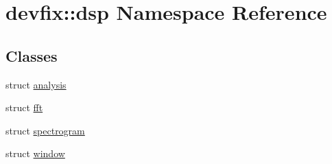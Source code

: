 \hypertarget{namespacedevfix_1_1dsp}{}\section{devfix\+:\+:dsp Namespace Reference}
\label{namespacedevfix_1_1dsp}
\subsection*{Classes}
\begin{DoxyCompactItemize}
\item 
struct \hyperlink{structdevfix_1_1dsp_1_1analysis}{analysis}
\item 
struct \hyperlink{structdevfix_1_1dsp_1_1fft}{fft}
\item 
struct \hyperlink{structdevfix_1_1dsp_1_1spectrogram}{spectrogram}
\item 
struct \hyperlink{structdevfix_1_1dsp_1_1window}{window}
\end{DoxyCompactItemize}
